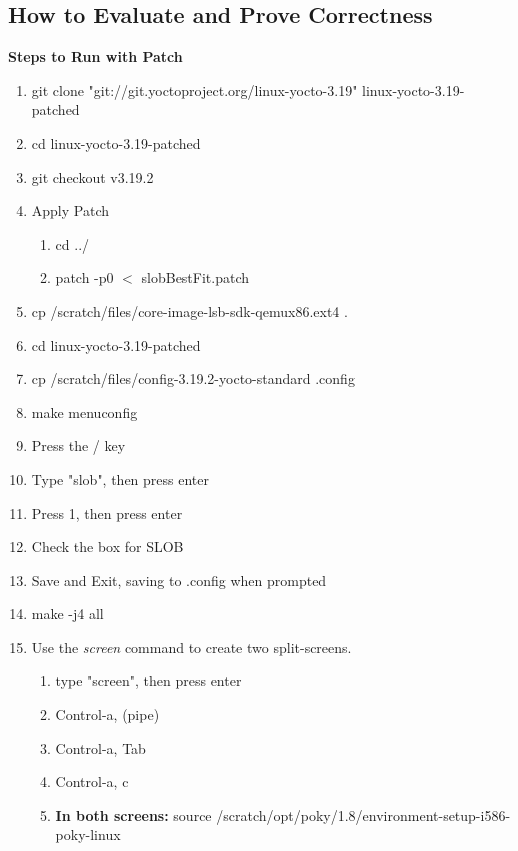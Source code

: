 \documentclass[draftclsnofoot, onecolumn, 10pt, compsoc]{IEEEtran}
\begin{document}
		\subsection{How to Evaluate and Prove Correctness}
			\textbf{Steps to Run with Patch}
			\begin{enumerate}
				\item git clone "git://git.yoctoproject.org/linux-yocto-3.19" linux-yocto-3.19-patched
				
				\item cd linux-yocto-3.19-patched
				
				\item git checkout v3.19.2
				
				\item Apply Patch
				\begin{enumerate}
					\item cd ../
					\item patch -p0 $<$ slobBestFit.patch
				\end{enumerate}
				
				\item cp /scratch/files/core-image-lsb-sdk-qemux86.ext4 .
				\item cd linux-yocto-3.19-patched
				\item cp /scratch/files/config-3.19.2-yocto-standard .config
				\item make menuconfig
				
				\item Press the / key
				\item Type "slob", then press enter
				\item Press 1, then press enter
				\item Check the box for SLOB
				\item Save and Exit, saving to .config when prompted
				
				\item make -j4 all
				
				\item Use the \textit{screen} command to create two split-screens.
				
				\begin{enumerate}
					\item type "screen", then press enter
					\item Control-a, (pipe)
					\item Control-a, Tab
					\item Control-a, c
					\item \textbf{In both screens:} source /scratch/opt/poky/1.8/environment-setup-i586-poky-linux


\end{enumerate}
\end{enumerate}
\end{document}

